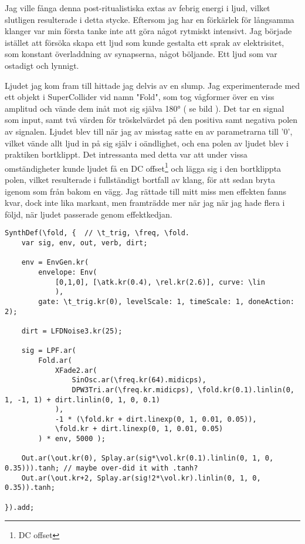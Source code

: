 \documentclass{article}
\begin{document}
  Jag ville fånga denna post-ritualistiska extas av febrig energi i ljud, vilket slutligen resulterade i detta
  stycke. Eftersom jag har en förkärlek för långsamma klanger var min första tanke inte att göra något
  rytmiskt intensivt. Jag började istället att försöka skapa ett ljud som kunde gestalta ett sprak av
  elektrisitet, som konstant överladdning av synapserna, något böljande. Ett ljud som var ostadigt och
  lynnigt. 

  Ljudet jag kom fram till hittade jag delvis av en slump. Jag experimenterade med ett objekt i
  SuperCollider vid namn "Fold", som tog vågformer över en viss amplitud och vände dem inåt mot sig själva
  180° ( se bild ). Det tar en signal som input, samt två värden för tröskelvärdet på den positiva samt
  negativa polen av signalen. Ljudet blev till när jag av misstag satte en av parametrarna till '0', vilket
  vände allt ljud in på sig själv i oändlighet, och ena polen av ljudet blev i praktiken bortklippt. Det
  intressanta med detta var att under vissa omständigheter kunde ljudet få en DC offset\footnote{DC offset}
  och lägga sig i den bortklippta polen, vilket resulterade i fullständigt bortfall av klang, för att sedan
  bryta igenom som från bakom en vägg. Jag rättade till mitt miss men effekten fanns kvar, dock inte lika
  markant, men framträdde mer när jag när jag hade flera i följd, när ljudet passerade genom effektkedjan.

\begin{lstlisting}[style=SuperCollider-IDE, caption=Fold-synt]
SynthDef(\fold, {  // \t_trig, \freq, \fold.
	var sig, env, out, verb, dirt;

	env = EnvGen.kr(
		envelope: Env(
			[0,1,0], [\atk.kr(0.4), \rel.kr(2.6)], curve: \lin
			), 
		gate: \t_trig.kr(0), levelScale: 1, timeScale: 1, doneAction: 2);

	dirt = LFDNoise3.kr(25);

	sig = LPF.ar( 
		Fold.ar(
			XFade2.ar(
				SinOsc.ar(\freq.kr(64).midicps), 
				DPW3Tri.ar(\freq.kr.midicps), \fold.kr(0.1).linlin(0, 1, -1, 1) + dirt.linlin(0, 1, 0, 0.1)
			),
			-1 * (\fold.kr + dirt.linexp(0, 1, 0.01, 0.05)),
			\fold.kr + dirt.linexp(0, 1, 0.01, 0.05)
		) * env, 5000 );

	Out.ar(\out.kr(0), Splay.ar(sig*\vol.kr(0.1).linlin(0, 1, 0, 0.35))).tanh; // maybe over-did it with .tanh?
	Out.ar(\out.kr+2, Splay.ar(sig!2*\vol.kr).linlin(0, 1, 0, 0.35)).tanh;

}).add;
\end{lstlisting}
\end{document}
